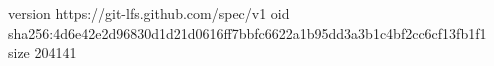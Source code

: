 version https://git-lfs.github.com/spec/v1
oid sha256:4d6e42e2d96830d1d21d0616ff7bbfc6622a1b95dd3a3b1c4bf2cc6cf13fb1f1
size 204141
